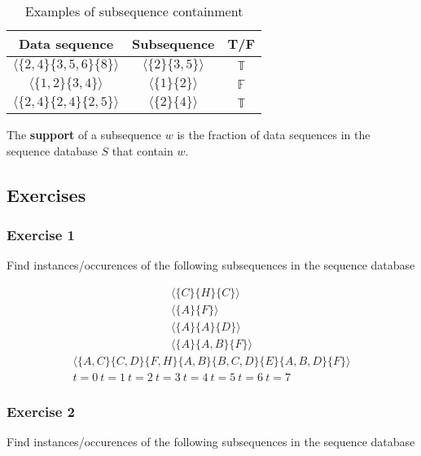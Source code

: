 \begin{table}[h]
\centering
\begin{tabular}{|c|c|c|}
\hline
\textbf{Data sequence} & \textbf{Subsequence} & \textbf{T/F} \\ \hline
$\langle \{2,4\} \{3,5,6\} \{8\} \rangle$ & $\langle \{2\} \{3,5\} \rangle$ & $\mathbb{T}$ \\ \hline
$\langle \{1,2\} \{3,4\} \rangle$ & $\langle \{1\} \{2\} \rangle$ & $\mathbb{F}$ \\ \hline
$\langle \{2,4\} \{2,4\} \{2,5\} \rangle$ & $\langle \{2\} \{4\} \rangle$ & $\mathbb{T}$ \\ \hline
\end{tabular}
\caption{Examples of subsequence containment}
\label{tab:subsequence-examples}
\end{table}

\begin{definition}
   The \textbf{support} of a subsequence $w$ is the fraction of data sequences in the sequence database $S$ that contain $w$.
\end{definition}

\subsection{Exercises}
\subsubsection{Exercise 1}
Find instances/occurences of the following subsequences in the sequence database 

\begin{gather*}
   \langle\{C\}\{H\}\{C\}\rangle \\
   \langle\{A\} \{F\} \rangle \\
   \langle\{A\}\{A\}\{D\}\rangle \\
   \langle\{A\}\{A,B\}\{F\}\rangle 
\end{gather*}
\begin{gather*}
   \langle \{A,C\} \{C,D\} \{F,H\} \{A,B\} \{B,C,D\} \{E\} \{A,B,D\} \{F\} \rangle\\
   t=0\ t=1\ t=2\ t=3\ t=4\ t=5\ t=6\ t=7
\end{gather*}

\subsubsection{Exercise 2}
Find instances/occurences of the following subsequences in the sequence database

